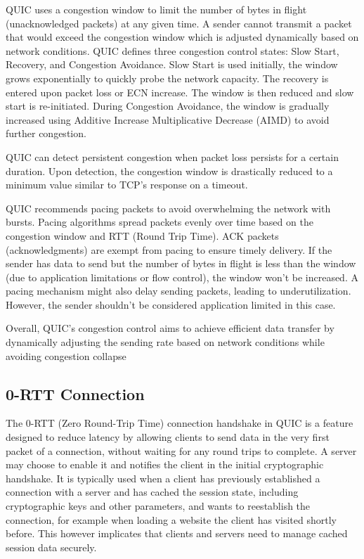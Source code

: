 QUIC uses a congestion window to limit the number of bytes in flight (unacknowledged packets) at any given time. A sender cannot
transmit a packet that would exceed the congestion window which is adjusted dynamically based on network conditions. QUIC defines
three congestion control states: Slow Start, Recovery, and Congestion Avoidance. Slow Start is used initially, the window grows
exponentially to quickly probe the network capacity. The recovery is entered upon packet loss or ECN increase. The window is
then reduced and slow start is re-initiated. During Congestion Avoidance, the window is gradually increased using Additive
Increase Multiplicative Decrease (AIMD) to avoid further congestion.

QUIC can detect persistent congestion when packet loss persists for a certain duration. Upon detection, the congestion window is
drastically reduced to a minimum value similar to TCP's response on a timeout.

QUIC recommends pacing packets to avoid overwhelming the network with bursts. Pacing algorithms spread packets evenly over time
based on the congestion window and RTT (Round Trip Time). ACK packets (acknowledgments) are exempt from pacing to ensure timely delivery.
If the sender has data to send but the number of bytes in flight is less than the window (due to application limitations or flow control),
the window won't be increased. A pacing mechanism might also delay sending packets, leading to underutilization. However, the sender
shouldn't be considered application limited in this case.

Overall, QUIC's congestion control aims to achieve efficient data transfer by dynamically adjusting the sending rate based on network
conditions while avoiding congestion collapse

\subsection{0-RTT Connection} \label{zero_rtt}

The 0-RTT (Zero Round-Trip Time) connection handshake in QUIC is a feature designed to reduce latency by allowing clients to send
data in the very first packet of a connection, without waiting for any round trips to complete. A server may choose to enable it
and notifies the client in the initial cryptographic handshake. It is typically used when a client has previously established a
connection with a server and has cached the session state, including cryptographic keys and other parameters, and wants to
reestablish the connection, for example when loading a website the client has visited shortly before. This however implicates
that clients and servers need to manage cached session data securely.

